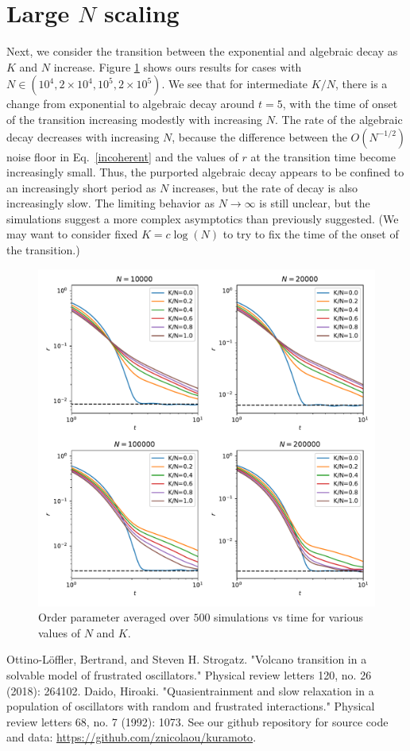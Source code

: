 \documentclass[aps,pre,amsmath,amssymb,floatfix,onecolumn,notitlepage,10pt]{revtex4-1}
\begin{document}
\section{Large $N$ scaling}
Next, we consider the transition between the exponential and algebraic decay as $K$ and $N$ increase. Figure \ref{fig3} shows ours results for cases with $N\in(10^4, 2\times 10^4, 10^5,2\times10^5)$. We see that for intermediate $K/N$, there is a change from exponential to algebraic decay around $t=5$, with the time of onset of the transition increasing modestly with increasing $N$.  The rate of the algebraic decay decreases with increasing $N$, because the difference between the $O(N^{-1/2})$ noise floor in Eq.~\eqref{incoherent} and the values of $r$ at the transition time become increasingly small. Thus, the purported algebraic decay appears to be confined to an increasingly short period as $N$ increases, but the rate of decay is also increasingly slow. The limiting behavior as $N\to\infty$ is still unclear, but the simulations suggest a more complex asymptotics than previously suggested. (We may want to consider fixed $K=c\log(N)$ to try to fix the time of the onset of the transition.)
\begin{figure}[hbt]
\includegraphics[width=0.75\columnwidth]{orders2.pdf}
\caption{Order parameter averaged over $500$ simulations vs time for various values of $N$ and $K$. \label{fig3}}
\end{figure}
\pagebreak

\begin{thebibliography}{99}
Ottino-L\"{o}ffler, Bertrand, and Steven H. Strogatz. "Volcano transition in a solvable model of frustrated oscillators." Physical review letters 120, no. 26 (2018): 264102.
Daido, Hiroaki. "Quasientrainment and slow relaxation in a population of oscillators with random and frustrated interactions." Physical review letters 68, no. 7 (1992): 1073.
See our github repository for source code and data: \url{https://github.com/znicolaou/kuramoto}.
\end{thebibliography}
\end{document}

